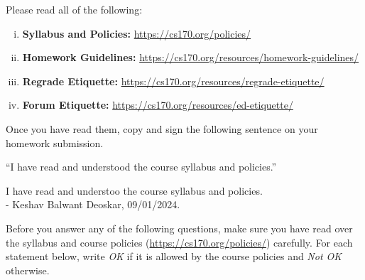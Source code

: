 \documentclass[11pt]{article}
\begin{document}
\begin{subparts}
    \subpart Please read all of the following: 

    \begin{enumerate}[(i)]
        \item \textbf{Syllabus and Policies:} \url{https://cs170.org/policies/}
        \item \textbf{Homework Guidelines:} \url{https://cs170.org/resources/homework-guidelines/}
        \item \textbf{Regrade Etiquette:} \url{https://cs170.org/resources/regrade-etiquette/}
        \item \textbf{Forum Etiquette:} \url{https://cs170.org/resources/ed-etiquette/}
    \end{enumerate}

    Once you have read them, copy and sign the following sentence on your homework submission.

    ``I have read and understood the course syllabus and policies.''

    \begin{solution}
        I have read and understoo the course syllabus and policies.\\
        - Keshav Balwant Deoskar, 09/01/2024.
    \end{solution}

\end{subparts}


\newpage
{}

Before you answer any of the following questions, make sure you have read over the syllabus and course policies (\url{https://cs170.org/policies/}) carefully.
For each statement below, write \textit{OK} if it is allowed by the course policies and \textit{Not OK} otherwise.
\end{document}
